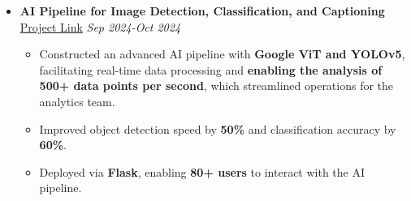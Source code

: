 \documentclass[a4paper,10pt]{article}
\begin{document}
\begin{itemize}

\vspace{-0.5mm}
\item {\bf AI Pipeline for Image Detection, Classification, and Captioning}  
\href{https://github.com/kaushik1064/INFLIECT_AI_PIPELINE-PROJECT.git}{Project Link}  
\textit{\hfill {Sep 2024-Oct 2024}}

\begin{itemize}

\vspace{-2mm}
\item Constructed an advanced AI pipeline with \textbf{Google ViT and YOLOv5}, facilitating real-time data processing and \textbf{enabling the analysis of 500+ data points per second}, which streamlined operations for the analytics team.  
\item Improved object detection speed by \textbf{50\%} and classification accuracy by \textbf{60\%}.  
\item Deployed via \textbf{Flask}, enabling \textbf{80+ users} to interact with the AI pipeline.  

\vspace{-2mm}
\end{itemize}
\end{itemize}
\end{document}
